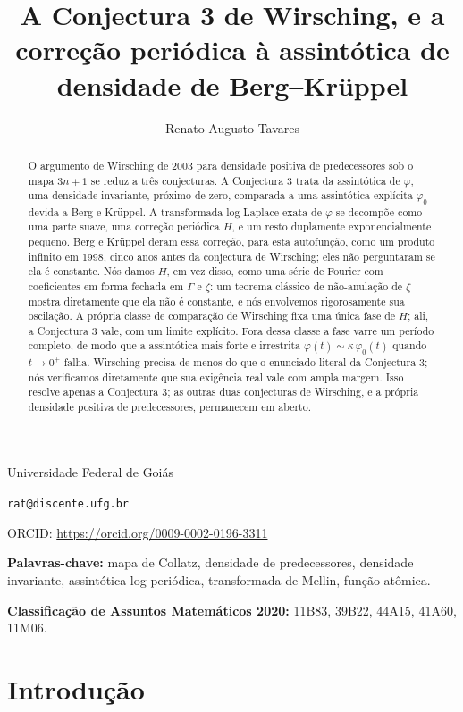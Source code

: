 \documentclass[11pt]{amsart}
\title[Conjectura 3 de Wirsching]{A Conjectura 3 de Wirsching, e a correção periódica à assintótica de densidade de Berg--Kr\"uppel}
\author{Renato Augusto Tavares}
\theoremstyle{plain}
\theoremstyle{definition}
\theoremstyle{remark}
\begin{document}
\maketitle

\vspace{-2.5em}
\begin{center}
\normalsize Universidade Federal de Goi\'as \par
\texttt{rat@discente.ufg.br} \par
ORCID: \url{https://orcid.org/0009-0002-0196-3311}
\end{center}

\begin{abstract}
O argumento de Wirsching de 2003 para densidade positiva de predecessores sob o mapa $3n+1$ se
reduz a três conjecturas. A Conjectura 3 trata da assintótica de $\varphi$, uma densidade
invariante, próximo de zero, comparada a uma assintótica explícita $\varphi_0$ devida a Berg e
Kr\"uppel. A transformada log-Laplace exata de $\varphi$ se decompõe como uma parte suave, uma
correção periódica $H$, e um resto duplamente exponencialmente pequeno. Berg e Kr\"uppel deram essa
correção, para esta autofunção, como um produto infinito em 1998, cinco anos antes da conjectura de
Wirsching; eles não perguntaram se ela é constante. Nós damos $H$, em vez disso, como uma série de
Fourier com coeficientes em forma fechada em $\Gamma$ e $\zeta$: um teorema clássico de não-anulação
de $\zeta$ mostra diretamente que ela não é constante, e nós envolvemos rigorosamente sua oscilação.
A própria classe de comparação de Wirsching fixa uma única fase de $H$; ali, a Conjectura 3 vale,
com um limite explícito. Fora dessa classe a fase varre um período completo, de modo que a
assintótica mais forte e irrestrita $\varphi(t) \sim \kappa\,\varphi_0(t)$ quando $t \to 0^+$ falha.
Wirsching precisa de menos do que o enunciado literal da Conjectura 3; nós verificamos diretamente
que sua exigência real vale com ampla margem. Isso resolve apenas a Conjectura 3; as outras duas
conjecturas de Wirsching, e a própria densidade positiva de predecessores, permanecem em aberto.
\end{abstract}

\noindent\textbf{Palavras-chave:} mapa de Collatz, densidade de predecessores, densidade invariante,
assintótica log-periódica, transformada de Mellin, função atômica.

\noindent\textbf{Classificação de Assuntos Matemáticos 2020:} 11B83, 39B22, 44A15, 41A60, 11M06.

\section{Introdução}
\end{document}
